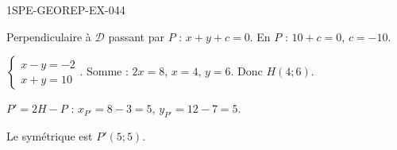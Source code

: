 \begin{corrige}{1SPE-GEOREP-EX-044}

Perpendiculaire à $\mathcal{D}$ passant par $P$ : $x + y + c = 0$. En $P$ : $10 + c = 0$, $c = -10$.

$\begin{cases} x - y = -2 \\ x + y = 10 \end{cases}$. Somme : $2x = 8$, $x = 4$, $y = 6$. Donc $H(4 ; 6)$.

$P' = 2H - P$ : $x_{P'} = 8 - 3 = 5$, $y_{P'} = 12 - 7 = 5$.

Le symétrique est $\boxed{P'(5 ; 5)}$.

\end{corrige}
